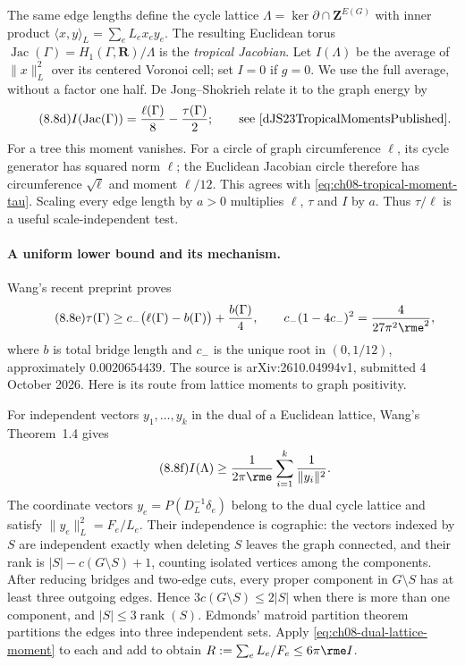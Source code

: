 The same edge lengths define the cycle lattice
$\Lambda=\ker\partial\cap\mathbf Z^{E(G)}$ with inner product
$\langle x,y\rangle_L=\sum_eL_ex_ey_e$. The resulting Euclidean torus
$\operatorname{Jac}(\Gamma)=H_1(\Gamma,\mathbf R)/\Lambda$ is the
\emph{tropical Jacobian}. Let $I(\Lambda)$ be the average of
$\|x\|_L^2$ over its centered Voronoi cell; set $I=0$ if $g=0$.
We use the full average, without a factor one half. De Jong--Shokrieh
relate it to the graph energy by
\[\tag{8.8d}\label{eq:ch08-tropical-moment-tau}
 I(\operatorname{Jac}(\Gamma))=\frac{\ell(\Gamma)}8-\frac{\tau(\Gamma)}2;
 \qquad\text{see \cite[Theorem~11.4]{dJS23TropicalMomentsPublished}.}
\]
For a tree this moment vanishes. For a circle of graph circumference
$\ell$, its cycle generator has squared norm $\ell$; the Euclidean
Jacobian circle therefore has circumference $\sqrt\ell$ and moment
$\ell/12$. This agrees with \eqref{eq:ch08-tropical-moment-tau}.
Scaling every edge length by $a>0$ multiplies $\ell$, $\tau$ and $I$
by $a$. Thus $\tau/\ell$ is a useful scale-independent test.

\paragraph{A uniform lower bound and its mechanism.}
Wang's recent preprint \cite[Theorem~1.1]{Wang26TauV1} proves
\[\tag{8.8e}\label{eq:ch08-tau-uniform-bound}
 \tau(\Gamma)\geq c_-\bigl(\ell(\Gamma)-b(\Gamma)\bigr)
                         +\frac{b(\Gamma)}4,
 \qquad
 c_-(1-4c_-)^2=\frac4{27\pi^2\rme^2},
\]
where $b$ is total bridge length and $c_-$ is the unique root in
$(0,1/12)$, approximately $0.0020654439$. The source is
arXiv:\allowbreak 2610.04994v1, submitted 4 October 2026.
Here is its route from lattice moments to graph positivity.

For independent vectors $y_1,\ldots,y_k$ in the dual of a Euclidean
lattice, Wang's Theorem~1.4 gives
\[\tag{8.8f}\label{eq:ch08-dual-lattice-moment}
 I(\Lambda)\geq\frac1{2\pi\rme}\sum_{i=1}^k\frac1{\|y_i\|^2}.
\]
The coordinate vectors $y_e=P(D_L^{-1}\delta_e)$ belong to the dual
cycle lattice and satisfy $\|y_e\|_L^2=F_e/L_e$.
Their independence is cographic: the vectors indexed by $S$ are
independent exactly when deleting $S$ leaves the graph connected,
and their rank is $|S|-c(G\setminus S)+1$, counting isolated
vertices among the components. After reducing bridges and two-edge
cuts, every proper component in $G\setminus S$ has at least three
outgoing edges. Hence $3c(G\setminus S)\leq2|S|$ when there is
more than one component, and $|S|\leq3\operatorname{rank}(S)$.
Edmonds' matroid partition theorem
\cite[Theorem~1]{Edmonds65MatroidPartitionPublished} partitions the
edges into three independent sets. Apply
\eqref{eq:ch08-dual-lattice-moment} to each and add to obtain
$R:=\sum_eL_e/F_e\leq6\pi\rme I$.

